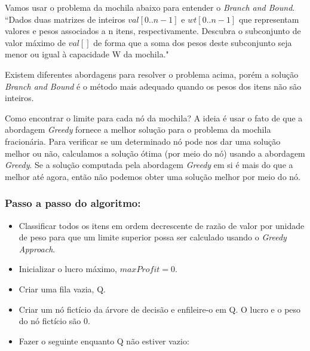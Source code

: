 Vamos usar o problema da mochila abaixo para entender o \emph{Branch and Bound}.
``Dados duas matrizes de inteiros $val[0..n-1]$ e $wt[0..n-1]$ que representam valores e pesos associados a n itens, respectivamente. 
Descubra o subconjunto de valor máximo de $val[]$ de forma que a soma dos pesos deste subconjunto seja menor ou igual à capacidade W da mochila."

Existem diferentes abordagens para resolver o problema acima, porém a solução \emph{Branch and Bound} é o método mais adequado quando os pesos dos itens não são inteiros.

Como encontrar o limite para cada nó da mochila?
A ideia é usar o fato de que a abordagem \emph{Greedy} fornece a melhor solução para o problema da mochila fracionária.
Para verificar se um determinado nó pode nos dar uma solução melhor ou não, calculamos a solução ótima (por meio do nó) usando a abordagem \emph{Greedy}. 
Se a solução computada pela abordagem \emph{Greedy} em si é mais do que a melhor até agora, então não podemos obter uma solução melhor por meio do nó.

\subsubsection*{Passo a passo do algoritmo:}

\begin{itemize}
    \item Classificar todos os itens em ordem decrescente de razão de valor por unidade de peso para que um limite superior possa ser calculado usando o \emph{Greedy Approach}.
    \item Inicializar o lucro máximo, $maxProfit = 0$.
    \item Criar uma fila vazia, Q.
    \item Criar um nó fictício da árvore de decisão e enfileire-o em Q. O lucro e o peso do nó fictício são 0.
\end{itemize}

\begin{itemize}
    \item Fazer o seguinte enquanto Q não estiver vazio:
\end{itemize}
 
